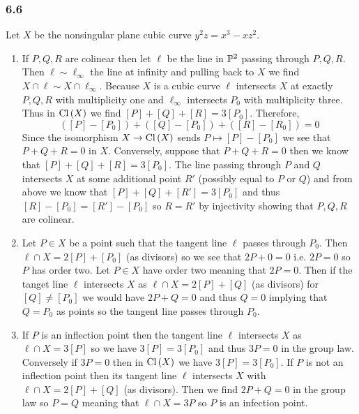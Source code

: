 \documentclass[12pt]{article}
\begin{document}
\subsubsection{6.6}

Let $X$ be the nonsingular plane cubic curve $y^2 z = x^3 - x z^2$. 
\begin{enumerate}
\item 
If $P, Q, R$ are colinear then let $\ell$ be the line in $\P^2$ passing through $P,Q,R$. Then $\ell \sim \ell_\infty$ the line at infinity and pulling back to $X$ we find $X \cap \ell \sim X \cap \ell_{\infty}$. Because $X$ is a cubic curve $\ell$ intersects $X$ at exactly $P,Q,R$ with multiplicity one and $\ell_{\infty}$ intersects $P_0$ with multiplicity three. Thus in $\Cl{X}$ we find $[P] + [Q] + [R] = 3 [P_0]$. Therefore,
\[ ([P] - [P_0]) + ([Q] - [P_0]) + ([R] - [R_0])  = 0 \]
Since the isomorphism $X \to \Cl{X}$ sends $P \mapsto [P] - [P_0]$ we see that $P + Q + R = 0$ in $X$. Conversely, suppose that $P + Q + R = 0$ then we know that $[P] + [Q] + [R] = 3 [P_0]$. The line passing through $P$ and $Q$ intersects $X$ at some additional point $R'$ (possibly equal to $P$ or $Q$) and from above we know that $[P] + [Q] + [R'] = 3 [P_0]$ and thus $[R] - [P_0] = [R'] - [P_0]$ so $R = R'$ by injectivity showing that $P,Q,R$ are colinear.

\item Let $P \in X$ be a point such that the tangent line $\ell$ passes through $P_0$. Then $\ell \cap X = 2 [P] + [P_0]$ (as divisors) so we see that $2 P + 0 = 0$ i.e. $2 P = 0$ so $P$ has order two. Let $P \in X$ have order two meaning that $2 P = 0$. Then if the tanget line $\ell$ intersects $X$ as $\ell \cap X = 2 [P] + [Q]$ (as divisors) for $[Q] \neq [P_0]$ we would have $2 P + Q = 0$ and thus $Q = 0$ implying that $Q = P_0$ as points so the tangent line passes through $P_0$. 

\item If $P$ is an inflection point then the tangent line $\ell$ intersects $X$ as $\ell \cap X = 3 [P]$ so we have $3 [P] = 3 [P_0]$ and thus $3 P = 0$ in the group law. Conversely if $3 P = 0$ then in $\Cl{X}$ we have $3 [P] = 3 [P_0]$. If $P$ is not an inflection point then its tangent line $\ell$ intersects $X$ with $\ell \cap X = 2 [P] + [Q]$ (as divisors). Then we find $2 P + Q = 0$ in the group law so $P = Q$ meaning that $\ell \cap X = 3 P$ so $P$ is an infection point.


\end{enumerate}
\end{document}
